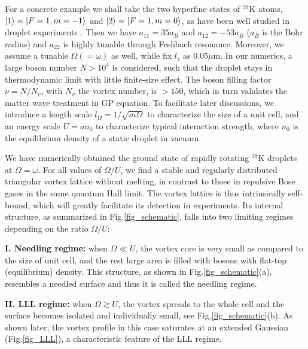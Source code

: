 \documentclass[reprint,aps,prl,twocolumn,superscriptaddress]{revtex4-1}
\begin{document}
For a concrete example we shall take the two  hyperfine states of ${}^{39}$K atoms, $\ket{1} = \ket{F=1,m=-1}$ and $\ket{2}=\ket{F=1,m=0}$, as have been well studied in droplet experiments \cite{Semeghini2018,Cabrera2018,Cheiney2018}. Then we have $a_{11}=35a_B$ and $a_{12}=-53a_B$ ($a_B$ is the Bohr radius) and  $a_{22}$ is highly tunable through Feshbach resonance. Moreover, we assume a tunable $\Omega(=\omega)$ as well, while fix $l_z$ as $0.05\mu$m. %
In our numerics, a large boson number $N>10^4$ is considered, such that the droplet stays in thermodynamic limit with little finite-size effect. The boson filling factor $\nu=N/N_v$, with $N_v$ the vortex number, is $> 150$, which in turn validates the matter wave treatment in GP equation.  To facilitate later discussions, we introduce  a length scale $l_{\Omega}=1/\sqrt{m\Omega}$ to characterize the size of a unit cell, and an energy scale $U=an_0$ to characterize typical interaction strength, where  $n_0$ is the equilibrium density of a static droplet in vacuum. 

We have numerically obtained the ground state of rapidly rotating ${}^{39}$K droplets at $\Omega=\omega$.  For all values of $\Omega/U$, we find a stable and  regularly distributed triangular vortex lattice without melting, in contrast to those in repulsive Bose gases in the same quantum Hall limit\cite{QH_expt1, QH_expt2}. The vortex lattice is thus intrinsically self-bound, which will greatly facilitate its detection in experiments. Its internal structure, as summarized in Fig.\ref{fig_schematic},  falls into two limiting regimes depending on the ratio $\Omega/U$:

{\bf I. Needling regime:} when $\Omega\ll U$, the vortex core is very small as compared to the size of unit cell, and the rest large area is filled with bosons with flat-top (equilibrium) density. This structure, as shown in Fig.\ref{fig_schematic}(a), resembles a needled surface and thus it is called the needling regime.

{\bf II. LLL regime:} when $\Omega\gtrsim U$, the vortex spreads to the whole cell and the surface becomes isolated and individually small, see Fig.\ref{fig_schematic}(b). As shown later, the vortex profile in this case saturates at an extended Gaussian (Fig.\ref{fig_LLL}), a characteristic feature of the LLL regime.
\end{document}
